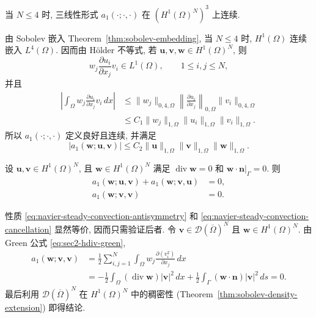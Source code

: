 \setcounter{statement}{0}
\begin{Lemma}\label{lem:navier-steady-convection-continuity}
当 $N\leq4$ 时, 三线性形式 $a_1(\cdot;\cdot,\cdot)$ 在
$(H^1(\Omega)^N)^3$ 上连续.
\end{Lemma}
\begin{Proof}
由 Sobolev 嵌入 Theorem~\ref{thm:sobolev-embedding}, 当 $N\leq4$ 时,
$H^1(\Omega)$ 连续嵌入 $L^4(\Omega)$. 因而由 H\"older 不等式,
若 $\mathbf u,\mathbf v,\mathbf w\in H^1(\Omega)^N$, 则
\[
w_j\frac{\partial u_i}{\partial x_j}v_i\in L^1(\Omega),
\qquad 1\leq i,j\leq N,
\]
并且
\[
\begin{aligned}
\left|\int_\Omega
w_j\frac{\partial u_i}{\partial x_j}v_i\,dx\right|
&\leq
\|w_j\|_{0,4,\Omega}
\left\|\frac{\partial u_i}{\partial x_j}\right\|_{0,\Omega}
\|v_i\|_{0,4,\Omega}\\
&\leq C_1\|w_j\|_{1,\Omega}\|u_i\|_{1,\Omega}\|v_i\|_{1,\Omega}.
\end{aligned}
\]
所以 $a_1(\cdot;\cdot,\cdot)$ 定义良好且连续, 并满足
\[
|a_1(\mathbf w;\mathbf u,\mathbf v)|
\leq C_2\|\mathbf u\|_{1,\Omega}
\|\mathbf v\|_{1,\Omega}\|\mathbf w\|_{1,\Omega}.
\]
\end{Proof}

\setcounter{statement}{1}
\begin{Lemma}\label{lem:navier-steady-convection-skew}
设 $\mathbf u,\mathbf v\in H^1(\Omega)^N$, 且
$\mathbf w\in H^1(\Omega)^N$ 满足
$\operatorname{div}\mathbf w=0$ 和
$\mathbf w\cdot\mathbf n|_\Gamma=0$. 则
\begin{align}
a_1(\mathbf w;\mathbf u,\mathbf v)
+a_1(\mathbf w;\mathbf v,\mathbf u)&=0,
\label{eq:navier-steady-convection-antisymmetry}\\
a_1(\mathbf w;\mathbf v,\mathbf v)&=0.
\label{eq:navier-steady-convection-cancellation}
\end{align}
\end{Lemma}
\begin{Proof}
性质 \eqref{eq:navier-steady-convection-antisymmetry} 和
\eqref{eq:navier-steady-convection-cancellation} 显然等价, 因而只需验证后者.
令 $\mathbf v\in\mathcal D(\overline\Omega)^N$ 且
$\mathbf w\in H^1(\Omega)^N$. 由 Green 公式 \eqref{eq:sec2-hdiv-green},
\[
\begin{aligned}
a_1(\mathbf w;\mathbf v,\mathbf v)
&=\frac12\sum_{i,j=1}^{N}\int_\Omega
w_j\frac{\partial(v_i^2)}{\partial x_j}\,dx\\
&=-\frac12\int_\Omega(\operatorname{div}\mathbf w)|\mathbf v|^2\,dx
+\frac12\int_\Gamma(\mathbf w\cdot\mathbf n)|\mathbf v|^2\,ds=0.
\end{aligned}
\]
最后利用 $\mathcal D(\overline\Omega)^N$ 在 $H^1(\Omega)^N$ 中的稠密性
(Theorem~\ref{thm:sobolev-density-extension}) 即得结论.
\end{Proof}


